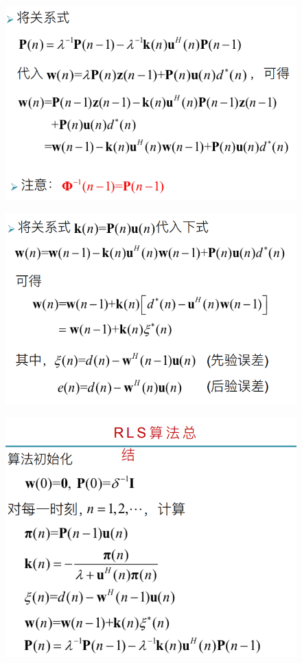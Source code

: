 \documentclass[UTF8]{ctexart} %
\begin{document}
				\begin{figure}[H]
					\centering\includegraphics[scale=0.4]{63.png}
				\end{figure}
				\begin{figure}[H]
					\centering\includegraphics[scale=0.45]{64.png}
				\end{figure}
				\begin{figure}[H]
					\centering\includegraphics[scale=0.4]{65.png}
				\end{figure}
\end{document}
